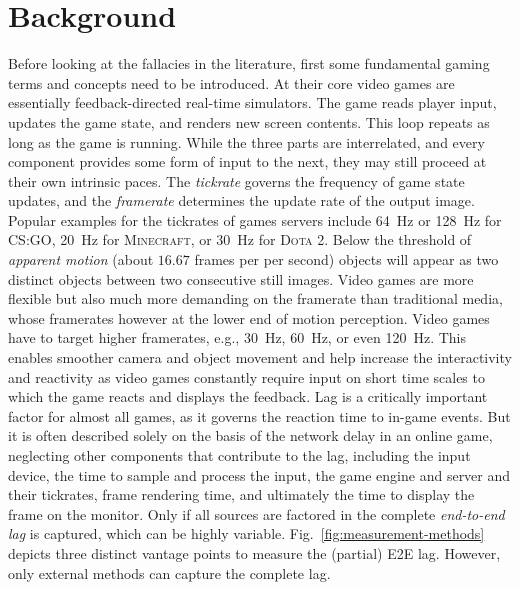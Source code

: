 \section{Background}
\label{sec:background}

Before looking at the fallacies in the literature, first some fundamental gaming terms and concepts need to be introduced. At their core video games are essentially feedback-directed real-time simulators. The game reads player input, updates the game state, and renders new screen contents. This loop repeats as long as the game is running. While the three parts are interrelated, and every component provides some form of input to the next, they may still proceed at their own intrinsic paces. The \textit{tickrate} governs the frequency of game state updates, and the \textit{framerate} determines the update rate of the output image. Popular examples for the tickrates of games servers include \SI{64}{\hertz} or \SI{128}{\hertz} for \textsc{CS:GO}, \SI{20}{\hertz} for \textsc{Minecraft}, or \SI{30}{\hertz} for \textsc{Dota 2}. Below the threshold of \textit{apparent motion} (about $16.67$ frames per per second) objects will appear as two distinct objects between two consecutive still images. Video games are more flexible but also much more demanding on the framerate than traditional media, whose framerates however at the lower end of motion perception. Video games have to target higher framerates, e.g., \SI{30}{\hertz}, \SI{60}{\hertz}, or even \SI{120}{\hertz}. This enables smoother camera and object movement and help increase the interactivity and reactivity as video games constantly require input on short time scales to which the game reacts and displays the feedback. Lag is a critically important factor for almost all games, as it governs the reaction time to in-game events. But it is often described solely on the basis of the network delay in an online game, neglecting other components that contribute to the lag, including the input device, the time to sample and process the input, the game engine and server and their tickrates, frame rendering time, and ultimately the time to display the frame on the monitor. Only if all sources are factored in the complete \textit{end-to-end lag} is captured, which can be highly variable. Fig.~\ref{fig:measurement-methods} depicts three distinct vantage points to measure the (partial) \gls{E2E} lag. However, only external methods can capture the complete lag.

